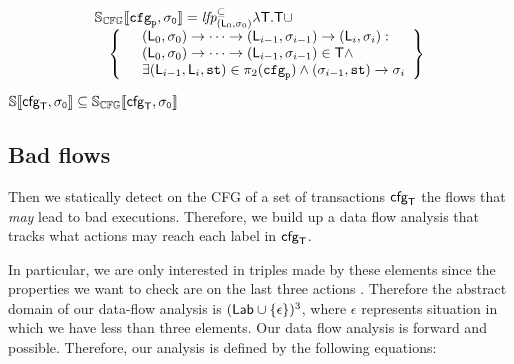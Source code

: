 \[
\begin{array}{l}
\mathbb{S_{CFG}}\llbracket \mathtt{\mathtt{cfg}_{\mathtt{p}}, \sigma_0} \rrbracket = \textit{lfp}_{(\mathsf{L}_0, \mathsf{\sigma}_0)}^{\subseteq} \lambda \mathsf{T} . \mathsf{T} \cup\\
\hspace{10pt} \left\{
\begin{array}{l}
\hspace{10pt} (\mathsf{L}_0, \mathsf{\sigma}_0) \to \cdots \to (\mathsf{L}_{i-1}, \mathsf{\sigma}_{i-1}) \to (\mathsf{L}_i, \mathsf{\sigma}_i) :\\
\hspace{10pt} (\mathsf{L}_0, \mathsf{\sigma}_0) \to \cdots \to (\mathsf{L}_{i-1}, \mathsf{\sigma}_{i-1})  \in \mathsf{T} \land\\
\hspace{10pt} \exists (\mathsf{L}_{i-1}, \mathsf{L}_i, \mathtt{st}) \in \pi_2(\mathtt{cfg}_{\mathtt{p}}) \land (\mathsf{\sigma}_{i-1}, \mathtt{st}) \to \mathsf{\sigma}_i\\
\end{array}
\right\}\\
\end{array}
\]



\begin{lemma}
$\mathbb{S}\llbracket \mathtt{\mathsf{cfg}_{\mathsf{T}}, \sigma_0} \rrbracket \subseteq \mathbb{S_{CFG}}\llbracket \mathtt{\mathsf{cfg}_{\mathsf{T}}, \sigma_0} \rrbracket$
\end{lemma}


\subsection{Bad flows}
Then we statically detect on the CFG of a set of transactions $\mathsf{cfg}_{\mathsf{T}}$ the flows that \emph{may} lead to bad executions. Therefore, we build up a data flow analysis that tracks what actions may reach each label in $\mathsf{cfg}_{\mathsf{T}}$.

In particular, we are only interested in triples made by these elements since the properties we want to check are on the last three actions . Therefore the abstract domain of our data-flow analysis is $(\mathsf{Lab} \cup \{\epsilon\})^3$, where $\epsilon$ represents situation in which we have less than three elements. Our data flow analysis is forward and possible. Therefore, our analysis is defined by the following equations:

